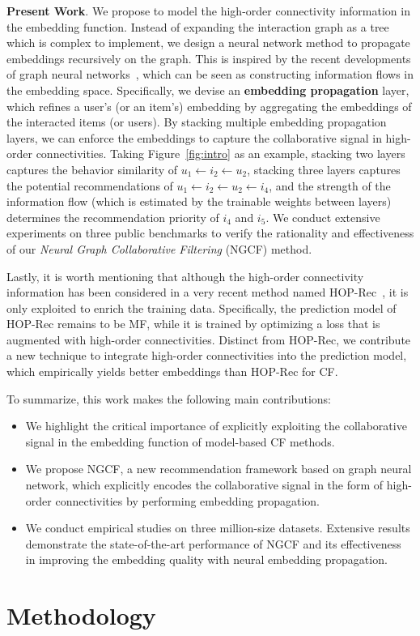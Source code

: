 \documentclass[sigconf]{acmart}
\theoremstyle{definition}
\begin{document}
\vspace{5pt}
\noindent\textbf{Present Work}. We propose to model the high-order connectivity information in the embedding function. Instead of expanding the interaction graph as a tree which is complex to implement, we design a neural network method to propagate embeddings recursively on the graph. This is inspired by the recent developments of graph neural networks~\cite{GraphSAGE,JumpKG,KGAT},
which can be seen as constructing information flows in the embedding space. Specifically, we devise an \textbf{embedding propagation} layer, which refines a user's (or an item's) embedding by aggregating the embeddings of the interacted items (or users). By stacking multiple embedding propagation layers, we can enforce the embeddings to capture the collaborative signal in high-order connectivities. Taking Figure~\ref{fig:intro} as an example, stacking two layers captures the behavior similarity of $u_1\leftarrow i_2\leftarrow u_2$, stacking three layers captures the potential recommendations of $u_1\leftarrow i_2\leftarrow u_2\leftarrow i_4$, and the strength of the information flow (which is estimated by the trainable weights between layers) determines the recommendation priority of $i_4$ and $i_5$. 
We conduct extensive experiments on three public benchmarks to verify the rationality and effectiveness of our \textit{Neural Graph Collaborative Filtering} (NGCF) method. 

Lastly, it is worth mentioning that although the high-order connectivity information has been considered in a very recent method named HOP-Rec~\cite{HOP-rec}, it is only exploited to enrich the training data. Specifically, the prediction model of HOP-Rec remains to be MF, while it is trained by optimizing a loss that is augmented with high-order connectivities. Distinct from HOP-Rec, we contribute a new technique to integrate high-order connectivities into the prediction model, which empirically yields better embeddings than HOP-Rec for CF. 

To summarize, this work makes the following main contributions:
\begin{itemize}[leftmargin=*]
    \item We highlight the critical importance of explicitly exploiting the collaborative signal in the embedding function of model-based CF methods. 
    
    \item We propose NGCF, a new recommendation framework based on graph neural network, which explicitly encodes the collaborative signal in the form of high-order connectivities by performing embedding propagation.
    
    \item We conduct empirical studies on three million-size datasets. Extensive results demonstrate the state-of-the-art performance of NGCF and its effectiveness in improving the embedding quality with neural embedding propagation.
\end{itemize} \section{Methodology}
\end{document}
